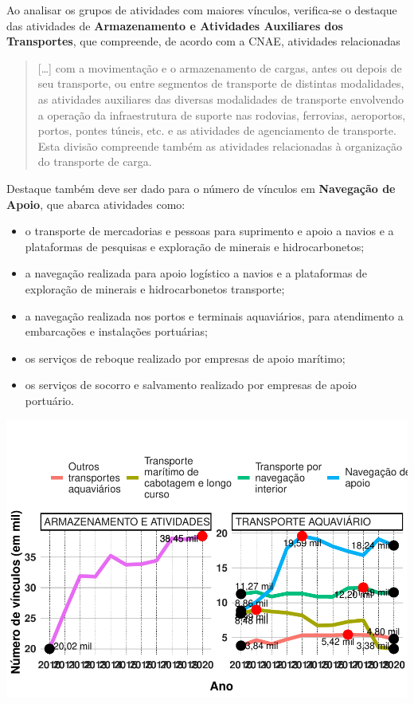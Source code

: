 \documentclass[
]{article}
\begin{document}
Ao analisar os grupos de atividades com maiores vínculos, verifica-se o
destaque das atividades de \textbf{Armazenamento e Atividades Auxiliares
dos Transportes}, que compreende, de acordo com a CNAE, atividades
relacionadas

\begin{quote}
{[}\ldots{]} com a movimentação e o armazenamento de cargas, antes ou
depois de seu transporte, ou entre segmentos de transporte de distintas
modalidades, as atividades auxiliares das diversas modalidades de
transporte envolvendo a operação da infraestrutura de suporte nas
rodovias, ferrovias, aeroportos, portos, pontes túneis, etc. e as
atividades de agenciamento de transporte. Esta divisão compreende também
as atividades relacionadas à organização do transporte de carga.
\end{quote}

Destaque também deve ser dado para o número de vínculos em
\textbf{Navegação de Apoio}, que abarca atividades como:

\begin{itemize}
\item
  o transporte de mercadorias e pessoas para suprimento e apoio a navios
  e a plataformas de pesquisas e exploração de minerais e
  hidrocarbonetos;
\item
  a navegação realizada para apoio logístico a navios e a plataformas de
  exploração de minerais e hidrocarbonetos transporte;
\item
  a navegação realizada nos portos e terminais aquaviários, para
  atendimento a embarcações e instalações portuárias;
\item
  os serviços de reboque realizado por empresas de apoio marítimo;
\item
  os serviços de socorro e salvamento realizado por empresas de apoio
  portuário.
\end{itemize}

\hfill\break

\includegraphics{mercado_trabalho_files/figure-latex/g_grupo-1.pdf}
\end{document}
